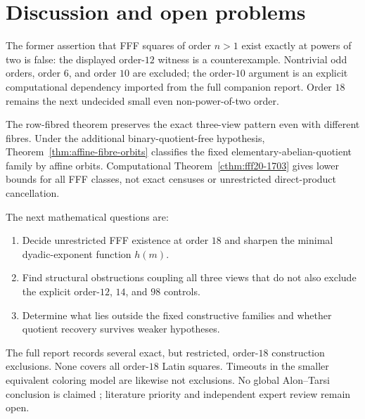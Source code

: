 \section{Discussion and open problems}

The former assertion that FFF squares of order $n>1$ exist exactly
at powers of two is false: the displayed order-$12$ witness is a
counterexample. Nontrivial odd orders, order $6$, and order $10$
are excluded; the order-$10$ argument is an explicit computational
dependency imported from the full companion report. Order $18$
remains the next undecided small even non-power-of-two order.

The row-fibred theorem preserves the exact three-view pattern even
with different fibres. Under the additional binary-quotient-free
hypothesis, Theorem~\ref{thm:affine-fibre-orbits} classifies the
fixed elementary-abelian-quotient family by affine orbits.
Computational Theorem~\ref{cthm:fff20-1703} gives lower
bounds for all FFF classes, not exact censuses or unrestricted
direct-product cancellation.

The next mathematical questions are:
\begin{enumerate}
\item Decide unrestricted FFF existence at order $18$ and sharpen
the minimal dyadic-exponent function $h(m)$.
\item Find structural obstructions coupling all three views that
do not also exclude the explicit order-$12$, $14$, and $98$ controls.
\item Determine what lies outside the fixed constructive families
and whether quotient recovery survives weaker hypotheses.
\end{enumerate}

The full report records several exact, but restricted, order-$18$
construction exclusions. None covers all order-$18$ Latin squares.
Timeouts in the smaller equivalent coloring model are likewise
not exclusions. No global Alon--Tarsi conclusion is claimed
\cite{AlonTarsi1992}; literature priority and independent expert
review remain open.
